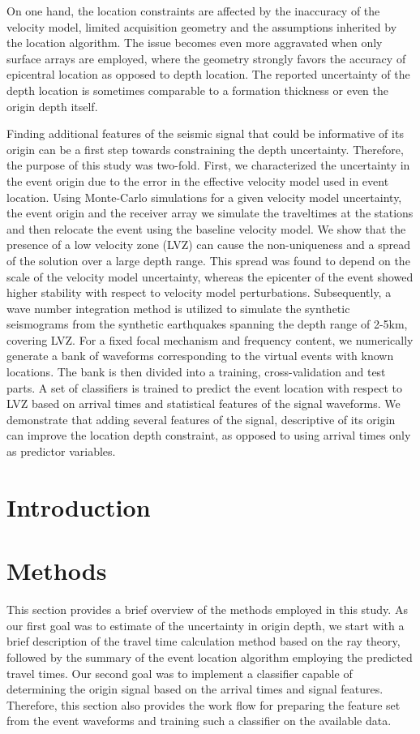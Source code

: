 On one hand, the location constraints are affected by the inaccuracy of the velocity model, limited acquisition geometry and the assumptions inherited by the location algorithm. The issue becomes even more aggravated when only surface arrays are employed, where the geometry strongly favors the accuracy of epicentral location as opposed to depth location. The reported uncertainty of the depth location is sometimes comparable to a formation thickness or even the origin depth itself.

Finding additional features of the seismic signal that could be informative of its origin can be a first step towards constraining the depth uncertainty. Therefore, the purpose of this study was two-fold. First, we characterized the uncertainty in the event origin due to the error in the effective velocity model used in event location. Using Monte-Carlo simulations for a given velocity model uncertainty, the event origin and the receiver array we simulate the traveltimes at the stations and then relocate the event using the baseline velocity model. We show that the presence of a low velocity zone (LVZ) can cause the non-uniqueness and a spread of the solution over a large depth range. This spread was found to depend on the scale of the velocity model uncertainty, whereas the epicenter of the event showed higher stability with respect to velocity model perturbations. Subsequently, a wave number integration method is utilized to simulate the synthetic seismograms from the synthetic earthquakes spanning the depth range of 2-5km, covering LVZ. For a fixed focal mechanism and frequency content, we numerically generate a bank of waveforms corresponding to the virtual events with known locations. The bank is then divided into a training, cross-validation and test parts. A set of classifiers is trained to predict the event location with respect to LVZ based on arrival times and statistical features of the signal waveforms. We demonstrate that adding several features of the signal, descriptive of its origin can improve the location depth constraint, as opposed to using arrival times only as predictor variables.
%
\section{Introduction}
%

\section{Methods}
%
This section provides a brief overview of the methods employed in this study. As our first goal was to estimate of the uncertainty in origin depth, we start with a brief description of the travel time calculation method based on the ray theory, followed by the summary of the event location algorithm employing the predicted travel times. Our second goal was to implement a classifier capable of determining the origin signal based on the arrival times and signal features. Therefore, this section also provides the work flow for preparing the feature set from the event waveforms and training such a classifier on the available data.

